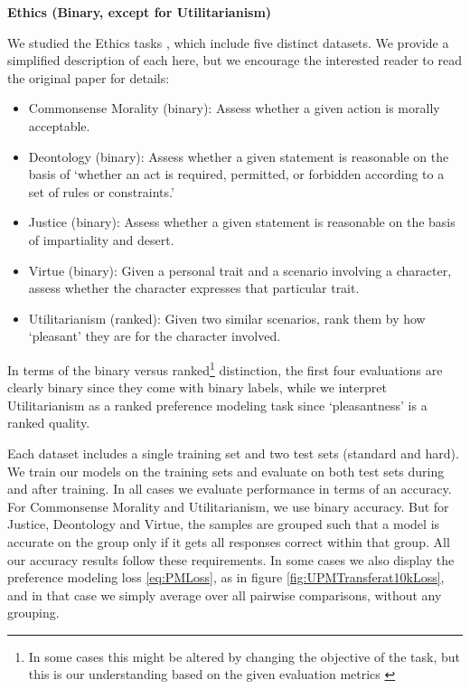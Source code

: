 {\bf Ethics (Binary, except for Utilitarianism)}

We studied the Ethics tasks \cite{hendrycks2021aligning}, which include five distinct datasets. We provide a simplified description of each  here, but we encourage the interested reader to read the original paper for details:

\begin{itemize}
    \item Commonsense Morality (binary): Assess whether a given action is morally acceptable.
    \item
    Deontology (binary): Assess whether a given statement is reasonable on the basis of `whether an act is required, permitted, or forbidden according to a set of rules or constraints.'
    \item
    Justice (binary): Assess whether a given statement is reasonable on the basis of impartiality and desert.
    \item
    Virtue (binary): Given a personal trait and a scenario involving a character, assess whether the character expresses that particular trait.
    \item
    Utilitarianism (ranked): Given two similar scenarios, rank them by how `pleasant' they are for the character involved.
\end{itemize}

In terms of the binary versus ranked\footnote{In some cases this might be altered by changing the objective of the task, but this is our understanding based on the given evaluation metrics  \cite{hendrycks2021aligning}} distinction, the first four evaluations are clearly binary since they come with binary labels, while we interpret Utilitarianism as a ranked preference modeling task since `pleasantness' is a ranked quality.

Each dataset includes a single training set and two test sets (standard  and  hard). We train our models on the training sets and evaluate on both test sets during and after training. In all cases we evaluate performance in terms of an accuracy. For Commonsense Morality and Utilitarianism, we use binary accuracy.  But for Justice, Deontology and Virtue, the samples are grouped such that a model is accurate on the group only if it gets all responses correct within that group. All our accuracy results follow these requirements. In some cases we also display the preference modeling loss \eqref{eq:PMLoss},  as in figure \ref{fig:UPMTransferat10kLoss}, and in that case we simply average over all pairwise comparisons, without any grouping.

